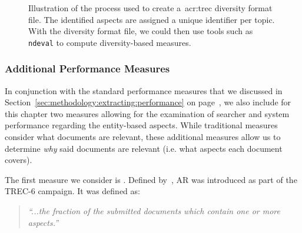 \begin{figure}[t!]
    \centering
    \caption[Entity-based aspects example]{Illustration of the process used to create a~\gls{acr:trec} diversity format file. The identified aspects are assigned a unique identifier per topic. With the diversity format file, we could then use tools such as \texttt{ndeval} to compute diversity-based measures.}
    \label{fig:entity_ids}
\end{figure}

\subsubsection{Additional Performance Measures}\label{sec:diversity:users:measures}
In conjunction with the standard performance measures that we discussed in Section~\ref{sec:methodology:extracting:performance} on page~\pageref{sec:methodology:extracting:performance}, we also include for this chapter two measures allowing for the examination of searcher and system performance regarding the entity-based aspects. While traditional measures consider what documents are relevant, these additional measures allow us to determine \emph{why} said documents are relevant (i.e. what aspects each document covers).

The first measure we consider is . Defined by~\cite{over1998trec}, AR was introduced as part of the TREC-6 campaign. It was defined as:

\begin{quote}
    \emph{``...the fraction of the submitted documents which contain one or more aspects.''}
\end{quote}


